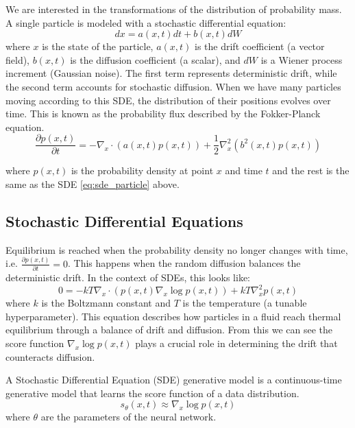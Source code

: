 \documentclass[conference,a4paper]{IEEEtran}
\begin{document}
We are interested in the transformations of the distribution of probability mass. A single particle is modeled with a stochastic differential equation:
\begin{equation}
    \label{eq:sde_particle}
    dx = a(x, t)dt + b(x, t)dW
\end{equation}
where $x$ is the state of the particle, $a(x, t)$ is the drift coefficient (a vector field), $b(x, t)$ is the diffusion coefficient (a scalar), and $dW$ is a Wiener process increment (Gaussian noise). The first term represents deterministic drift, while the second term accounts for stochastic diffusion. When we have many particles moving according to this SDE, the distribution of their positions evolves over time. This is known as the probability flux described by the Fokker-Planck equation.
\begin{equation}
    \label{eq:fokker-planck}
    \frac{\partial p(x, t)}{\partial t} = -\nabla_x \cdot (a(x, t)p(x, t)) + \frac{1}{2}\nabla^2_x(b^2(x, t)p(x, t))
\end{equation}

where $p(x, t)$ is the probability density at point $x$ and time $t$ and the rest is the same as the SDE \ref{eq:sde_particle} above.

\subsection{Stochastic Differential Equations}

Equilibrium is reached when the probability density no longer changes with time, i.e. $\frac{\partial p(x, t)}{\partial t} = 0$. This happens when the random diffusion balances the deterministic drift. In the context of SDEs, this looks like:
\begin{equation}
    \label{eq:equilibrium}
    0 = -kT \nabla_x \cdot (p(x, t) \nabla_x \log p(x,t)) + kT \nabla_x^2 p(x, t)
\end{equation}
where $k$ is the Boltzmann constant and $T$ is the temperature (a tunable hyperparameter). This equation describes how particles in a fluid reach thermal equilibrium through a balance of drift and diffusion. From this we can see the score function $\nabla_x \log p(x,t)$ plays a crucial role in determining the drift that counteracts diffusion.

A Stochastic Differential Equation (SDE) generative model \cite{songScoreBasedGenerativeModeling2021} is a continuous-time generative model that learns the score function of a data distribution. 
\begin{equation}
s_\theta(x, t) \approx \nabla_x \log p(x,t)
\end{equation}
where $\theta$ are the parameters of the neural network.
\end{document}
